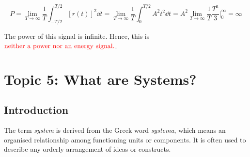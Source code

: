 \documentclass[
  12pt,
  a4paper,
]{report}
\begin{document}
\begin{equation}     
\label{eq:ramp-function-power}     
P = \lim_{T \to \infty} \frac{1}{T} \int_{-T/2}^{T/2} {[r(t)]}^2 \dd{t} = \lim_{T \to \infty} \frac{1}{T} \int_{0}^{T/2} A^2 t^2 \dd{t} = A^2 \lim_{T \to \infty} \frac{1}{T} \frac{T^3}{3} \Bigg|_{0}^{\infty} = \infty 
\end{equation} 

The power of this signal is infinite. Hence, this is
\(\textcolor{red}{\text{neither a power nor an energy signal.}}\).

\newpage{}

\section{Topic 5: What are Systems?}\label{topic-5-what-are-systems}

\subsection{Introduction}\label{introduction-1}

The term \emph{system} is derived from the Greek word \emph{systema},
which means an organised relationship among functioning units or
components. It is often used to describe any orderly arrangement of
ideas or constructs.
\end{document}
